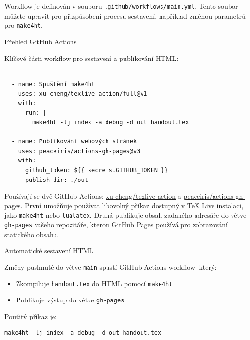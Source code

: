 Workflow je definován v souboru \texttt{.github/workflows/main.yml}.
Tento soubor můžete upravit pro přizpůsobení procesu sestavení, například změnou parametrů pro \texttt{make4ht}.

\begin{frame}[fragile]{Přehled GitHub Actions}

  \begin{block}{Klíčové části workflow pro sestavení a publikování HTML:}

\begin{verbatim}

  - name: Spuštění make4ht
    uses: xu-cheng/texlive-action/full@v1
    with:
      run: |
        make4ht -lj index -a debug -d out handout.tex

  - name: Publikování webových stránek
    uses: peaceiris/actions-gh-pages@v3
    with:
      github_token: ${{ secrets.GITHUB_TOKEN }}
      publish_dir: ./out
\end{verbatim}
\end{block}

\end{frame}


Používají se dvě GitHub Actions: \href{https://github.com/xu-cheng/texlive-action}{xu-cheng/texlive-action}
a \href{https://github.com/peaceiris/actions-gh-pages}{peaceiris/actions-gh-pages}.
První umožňuje používat libovolný příkaz dostupný v TeX Live instalaci, jako \texttt{make4ht} nebo \texttt{lualatex}.
Druhá publikuje obsah zadaného adresáře do větve \texttt{gh-pages} vašeho repozitáře,
kterou GitHub Pages používá pro zobrazování statického obsahu.

\begin{frame}[fragile]{Automatické sestavení HTML}
\begin{block}{}
Změny pushnuté do větve \texttt{main} spustí GitHub Actions workflow, který:

\begin{itemize}
\item Zkompiluje \texttt{handout.tex} do HTML pomocí \texttt{make4ht}
\item Publikuje výstup do větve \texttt{gh-pages}
\end{itemize}
\end{block}

\begin{block}{Použitý příkaz je:}
\begin{verbatim}
make4ht -lj index -a debug -d out handout.tex
\end{verbatim}
\end{block}
\end{frame}

